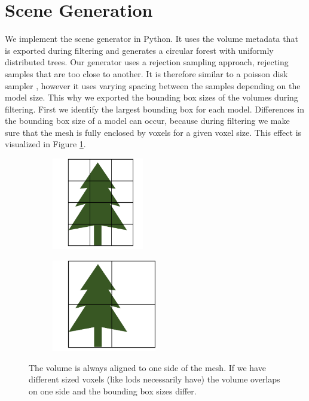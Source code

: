\section{Scene Generation}
\label{sec:scene_generation}
We implement the scene generator in Python.
It uses the volume metadata that is exported during filtering and generates a circular forest with uniformly distributed trees.
Our generator uses a rejection sampling approach, rejecting samples that are too close to another.
It is therefore similar to a poisson disk sampler \cite{poisson_sampling}, however it uses varying spacing between the samples depending on the model size.
This why we exported the bounding box sizes of the volumes during filtering.
First we identify the largest bounding box for each model.
Differences in the bounding box size of a model can occur, because during filtering we make sure that the mesh is fully enclosed by voxels for a given voxel size.
This effect is visualized in Figure \ref{fig:bounding_sizes}.
\begin{figure}[ht]
    \centering
    \begin{subfigure}[b]{0.45\linewidth}
        \centering
        \includegraphics[height=4cm]{img/bounding_size_1.png}
    \end{subfigure}
    \begin{subfigure}[b]{0.45\linewidth}
        \centering
        \includegraphics[height=4cm]{img/bounding_size_2.png}
    \end{subfigure}
	\caption[Bounding boxes resulting from different sized voxels]{The volume is always aligned to one side of the mesh. If we have different sized voxels (like \acsp{lod} necessarily have) the volume overlaps on one side and the bounding box sizes differ.}
	\label{fig:bounding_sizes}
\end{figure}

